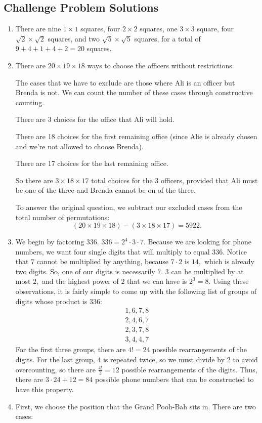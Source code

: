 \documentclass[12pt, letterpaper]{article}
\begin{document}
\newpage
\subsection{Challenge Problem Solutions}

\begin{enumerate}
    \item There are nine $1\times1$ squares, four $2\times2$ squares, one $3\times3$ square, four $\sqrt{2}\times\sqrt{2}$ squares, and two $\sqrt{5}\times\sqrt{5}$ squares, for a total of $9+4+1+4+2=\boxed{20}$ squares.
    \item There are $20 \times 19 \times 18$ ways to choose the officers without restrictions.
    
    The cases that we have to exclude are those where Ali is an officer but Brenda is not. We can count the number of these cases through constructive counting.
    
    There are 3 choices for the office that Ali will hold.
    
    There are 18 choices for the first remaining office (since Alie is already chosen and we're not allowed to choose Brenda).
    
    There are 17 choices for the last remaining office.
    
    So there are $3 \times 18 \times 17$ total choices for the 3 officers, provided that Ali must be one of the three and Brenda cannot be on of the three.
    
    To answer the original question, we subtract our excluded cases from the total number of permutations:
    $$(20\times19\times18) - (3\times18\times17) = \boxed{5922}.$$
    \item We begin by factoring $336$. $336 = 2^4 \cdot 3 \cdot 7.$ Because we are looking for phone numbers, we want four single digits that will multiply to equal $336.$ Notice that $7$ cannot be multiplied by anything, because $7 \cdot 2$ is $14,$ which is already two digits. So, one of our digits is necessarily $7.$ $3$ can be multiplied by at most $2,$ and the highest power of $2$ that we can have is $2^3 = 8.$ Using these observations, it is fairly simple to come up with the following list of groups of digits whose product is $336:$ 
    \begin{align*}
    1, 6, 7, 8\\
    2, 4, 6, 7\\
    2, 3, 7, 8\\
    3, 4, 4, 7
    \end{align*} 
    For the first three groups, there are $4! = 24$ possible rearrangements of the digits. For the last group, $4$ is repeated twice, so we must divide by $2$ to avoid overcounting, so there are $\frac{4!}{2} = 12$ possible rearrangements of the digits. Thus, there are $3 \cdot 24 + 12 = \boxed{84}$ possible phone numbers that can be constructed to have this property.
    \item First, we choose the position that the Grand Pooh-Bah sits in. There are two cases:
    

\end{enumerate}
\end{document}
